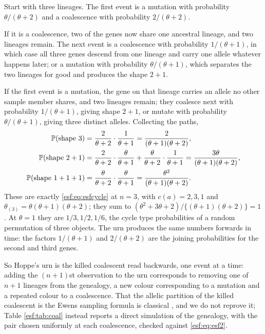 \begin{example}
\label{esf:ex:coal3}
Start with three lineages. The first event is a mutation with probability
$\theta/(\theta+2)$ and a coalescence with probability $2/(\theta+2)$.

If it is a coalescence, two of the genes now share one ancestral lineage, and two
lineages remain. The next event is a coalescence with probability $1/(\theta+1)$, in
which case all three genes descend from one lineage and carry one allele whatever
happens later; or a mutation with probability $\theta/(\theta+1)$, which separates the
two lineages for good and produces the shape $2+1$.

If the first event is a mutation, the gene on that lineage carries an allele no other
sample member shares, and two lineages remain; they coalesce next with probability
$1/(\theta+1)$, giving shape $2+1$, or mutate with probability $\theta/(\theta+1)$,
giving three distinct alleles. Collecting the paths,
\[
\begin{aligned}
\mathbb{P}(\text{shape } 3) &= \frac{2}{\theta+2}\cdot\frac{1}{\theta+1}
= \frac{2}{(\theta+1)(\theta+2)}, \\
\mathbb{P}(\text{shape } 2+1) &= \frac{2}{\theta+2}\cdot\frac{\theta}{\theta+1}
+ \frac{\theta}{\theta+2}\cdot\frac{1}{\theta+1}
= \frac{3\theta}{(\theta+1)(\theta+2)}, \\
\mathbb{P}(\text{shape } 1+1+1) &= \frac{\theta}{\theta+2}\cdot\frac{\theta}{\theta+1}
= \frac{\theta^{2}}{(\theta+1)(\theta+2)} .
\end{aligned}
\]
These are exactly \eqref{esf:eq:esfcycle} at $n = 3$, with $c(a) = 2, 3, 1$ and
$\theta_{(3)} = \theta(\theta+1)(\theta+2)$; they sum to
$(\theta^2 + 3\theta + 2)/\{(\theta+1)(\theta+2)\} = 1$. At $\theta = 1$ they are
$1/3, 1/2, 1/6$, the cycle type probabilities of a random permutation of three
objects. The urn produces the same numbers forwards in time: the factors
$1/(\theta+1)$ and $2/(\theta+2)$ are the joining probabilities for the second and
third genes.
\end{example}

So Hoppe's urn is the killed coalescent read backwards, one event at a time: adding
the $(n+1)$st observation to the urn corresponds to removing one of $n+1$ lineages
from the genealogy, a new colour corresponding to a mutation and a repeated colour to
a coalescence. That the allelic partition of the killed coalescent is the Ewens
sampling formula is classical \citep{esf:kingman1982b,esf:griffiths1979}, and we do not
reprove it; Table \ref{esf:tab:coal} instead reports a direct simulation of the genealogy,
with the pair chosen uniformly at each coalescence, checked against \eqref{esf:eq:esf2}.


